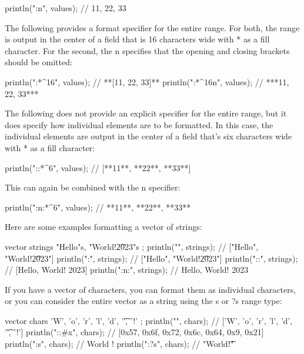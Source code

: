 \begin{cpp}
println("{{{:n}}}", values); // {11, 22, 33}
\end{cpp}

The following provides a format specifier for the entire range. For both, the range is output in the center of a field that is 16 characters wide with * as a fill character. For the second, the n specifies that the opening and closing brackets should be omitted:

\begin{cpp}
println("{:*^16}", values); // **[11, 22, 33]**
println("{:*^16n}", values); // ***11, 22, 33***
\end{cpp}

The following does not provide an explicit specifier for the entire range, but it does specify how individual elements are to be formatted. In this case, the individual elements are output in the center of a field that’s six characters wide with * as a fill character:

\begin{cpp}
println("{::*^6}", values); // [**11**, **22**, **33**]
\end{cpp}

This can again be combined with the n specifier:

\begin{cpp}
println("{:n:*^6}", values); // **11**, **22**, **33**
\end{cpp}

Here are some examples formatting a vector of strings:

\begin{cpp}
vector strings { "Hello"s, "World!\t2023"s };
println("{}", strings);     // ["Hello", "World!\t2023"]
println("{:}", strings);    // ["Hello", "World!\t2023"]
println("{::}", strings);   // [Hello, World!   2023]
println("{:n:}", strings);  // Hello, World!   2023
\end{cpp}

If you have a vector of characters, you can format them as individual characters, or you can consider the entire vector as a string using the s or ?s range type:

\begin{cpp}
vector chars { 'W', 'o', 'r', 'l', 'd', '\t', '!' };
println("{}", chars);       // ['W', 'o', 'r', 'l', 'd', '\t', '!']
println("{::#x}", chars);   // [0x57, 0x6f, 0x72, 0x6c, 0x64, 0x9, 0x21]
println("{:s}", chars);     // World    !
println("{:?s}", chars);    // "World\t!"
\end{cpp}

